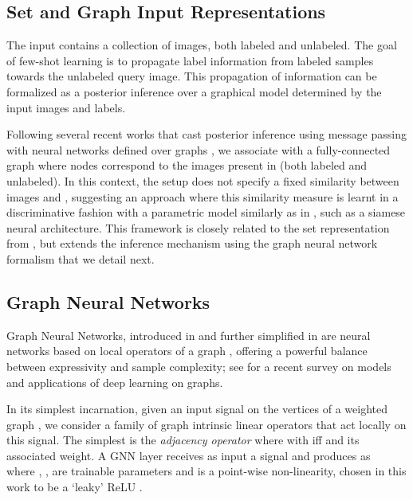 \documentclass{article} \usepackage{iclr2018_conference,times}
\begin{document}
\subsection{Set and Graph Input Representations}

The input  contains a collection of images, both labeled and unlabeled. 
The goal of few-shot learning is to propagate label information from labeled samples towards 
the unlabeled query image. This propagation of information can be formalized 
as a posterior inference over a graphical model determined by the input images and 
 labels. 

Following several recent works that 
cast posterior inference using message passing with neural networks defined over graphs \cite{scarselli09, duvenaud2015convolutional, gilmer2017neural}, 
we associate  with a fully-connected graph  
where nodes  correspond to the images present in  (both labeled and unlabeled). 
In this context, the setup does not specify a fixed similarity  between 
images  and , suggesting an approach where this similarity measure 
is learnt in a discriminative fashion with a parametric model similarly as in \cite{gilmer2017neural}, such as a siamese neural architecture. 
This framework is closely related to the set representation from \cite{vinyals2016matching}, 
but extends the inference mechanism using the graph neural network formalism that we detail next.





\subsection{Graph Neural Networks}

Graph Neural Networks, introduced in \cite{gori2005new,scarselli09} and further simplified in \cite{li2015gated, duvenaud2015convolutional, sukhbaatar2016learning} are neural networks based 
on local operators of a graph , offering a powerful balance 
between expressivity and sample complexity; see \cite{bronstein2017geometric} for a recent survey on models and applications of deep learning on graphs.

In its simplest incarnation, given an input signal  on the vertices of 
a weighted graph , we consider a family  of graph intrinsic linear operators that act locally on this signal.
The simplest is the \textit{adjacency operator}  where 
 with  iff  and
 its associated weight.
A GNN layer  receives as input a signal  and produces  as \\ {\small 
}
where , 
, are trainable parameters and  is a point-wise non-linearity, chosen in this work to be a `leaky' ReLU \cite{xu2015empirical}.
\end{document}
